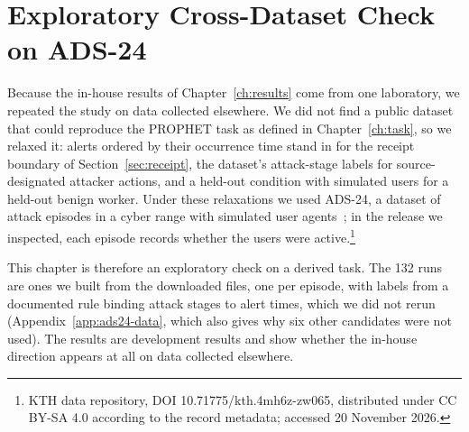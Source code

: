 \chapter{Exploratory Cross-Dataset Check on ADS-24}
\label{ch:ads24}

Because the in-house results of Chapter~\ref{ch:results} come from one
laboratory, we repeated the study on data collected elsewhere. We
did not find a public dataset that could reproduce the PROPHET task as
defined in Chapter~\ref{ch:task}, so we relaxed it: alerts ordered by
their occurrence time stand in for the receipt boundary of
Section~\ref{sec:receipt}, the dataset's attack-stage labels for
source-designated attacker actions, and a held-out condition with
simulated users for a held-out benign worker. Under these relaxations
we used ADS-24, a dataset of attack episodes in a cyber range with
simulated user agents~\cite{nyberg2026cyber}; in the release we
inspected, each episode records whether the users were active.\footnote{KTH
data repository, DOI 10.71775/kth.4mh6z-zw065, distributed under CC
BY-SA 4.0 according to the record metadata; accessed 20 November 2026.}

This chapter is therefore an exploratory check on a derived task. The
132 runs are ones we built from the downloaded files, one per episode,
with labels from a documented rule binding attack stages to alert
times, which we did not rerun (Appendix~\ref{app:ads24-data}, which
also gives why six other candidates were not used). The results are
development results and show whether the in-house direction appears at
all on data collected elsewhere.


